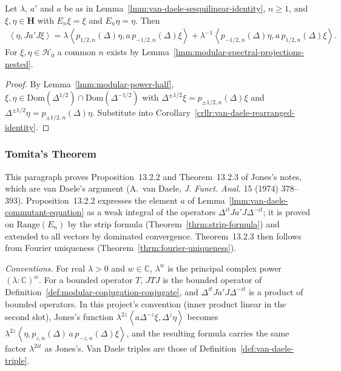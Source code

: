 \begin{corollary}
    \label{crllr:van-daele-rearranged-identity-H0}
    \leanok
    Let $\lambda$, $a'$ and $a$ be as in Lemma~\ref{lmm:van-daele-sesquilinear-identity}, $n \ge 1$, and $\xi, \eta \in \mathbf{H}$ with $E_n\xi = \xi$ and $E_n\eta = \eta$. Then
    \begin{align}
        \left< \eta, Ja'J\xi \right> = \lambda\left< p_{1/2,n}(\Delta)\eta, a\,p_{-1/2,n}(\Delta)\xi \right> + \lambda^{-1}\left< p_{-1/2,n}(\Delta)\eta, a\,p_{1/2,n}(\Delta)\xi \right>.
    \end{align}
    For $\xi, \eta \in \mathcal{H}_0$ a common $n$ exists by Lemma~\ref{lmm:modular-spectral-projections-nested}.
\end{corollary}
\begin{proof}
    \leanok
    By Lemma~\ref{lmm:modular-power-half}, $\xi, \eta \in \text{Dom}(\Delta^{1/2}) \cap \text{Dom}(\Delta^{-1/2})$ with $\Delta^{\pm 1/2}\xi = p_{\pm 1/2,n}(\Delta)\xi$ and $\Delta^{\pm 1/2}\eta = p_{\pm 1/2,n}(\Delta)\eta$. Substitute into Corollary~\ref{crllr:van-daele-rearranged-identity}.
\end{proof}

\subsubsection{Tomita's Theorem}

This paragraph proves Proposition~13.2.2 and Theorem~13.2.3 of Jones's notes, which are van Daele's argument (A.~van Daele, \emph{J. Funct. Anal.} 15 (1974) 378--393). Proposition~13.2.2 expresses the element $a$ of Lemma~\ref{lmm:van-daele-commutant-equation} as a weak integral of the operators $\Delta^{it}Ja'J\Delta^{-it}$; it is proved on $\text{Range}(E_n)$ by the strip formula (Theorem~\ref{thrm:strip-formula}) and extended to all vectors by dominated convergence. Theorem~13.2.3 then follows from Fourier uniqueness (Theorem~\ref{thrm:fourier-uniqueness}).

\emph{Conventions.} For real $\lambda > 0$ and $w \in \mathbb{C}$, $\lambda^w$ is the principal complex power $(\lambda : \mathbb{C})^w$. For a bounded operator $T$, $JTJ$ is the bounded operator of Definition~\ref{def:modular-conjugation-conjugate}, and $\Delta^{it}Ja'J\Delta^{-it}$ is a product of bounded operators. In this project's convention (inner product linear in the second slot), Jones's function $\lambda^{2z}\left< a\Delta^{-z}\xi, \Delta^{\overline{z}}\eta \right>$ becomes $\lambda^{2z}\left< \eta, p_{z,n}(\Delta)\,a\,p_{-z,n}(\Delta)\xi \right>$, and the resulting formula carries the same factor $\lambda^{2it}$ as Jones's. Van Daele triples are those of Definition~\ref{def:van-daele-triple}.

